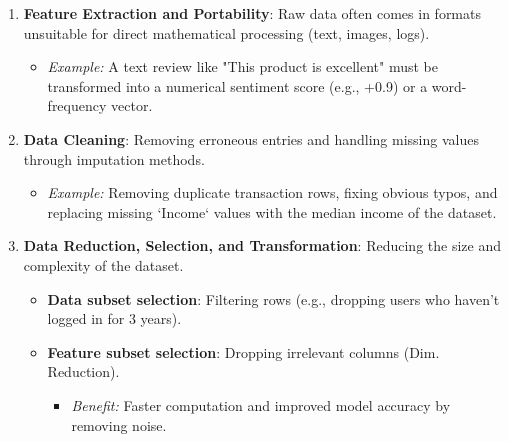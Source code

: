 \begin{enumerate}
    \item \textbf{Feature Extraction and Portability}: Raw data often comes in formats unsuitable for direct mathematical processing (text, images, logs).
    \begin{itemize}
        \item \textit{Example:} A text review like "This product is excellent" must be transformed into a numerical sentiment score (e.g., +0.9) or a word-frequency vector.
    \end{itemize}
    
    \vspace{0.15cm}
    \item \textbf{Data Cleaning}: Removing erroneous entries and handling missing values through imputation methods.
    \begin{itemize}
        \item \textit{Example:} Removing duplicate transaction rows, fixing obvious typos, and replacing missing `Income` values with the median income of the dataset.
    \end{itemize}

    \vspace{0.15cm}
    \item \textbf{Data Reduction, Selection, and Transformation}: Reducing the size and complexity of the dataset.
    \begin{itemize}
        \item \textbf{Data subset selection}: Filtering rows (e.g., dropping users who haven't logged in for 3 years).
        \item \textbf{Feature subset selection}: Dropping irrelevant columns (Dim. Reduction).
        \begin{itemize}[label=*]
        \item \textit{Benefit:} Faster computation and improved model accuracy by removing noise.
      \end{itemize}
    \end{itemize}
\end{enumerate}

